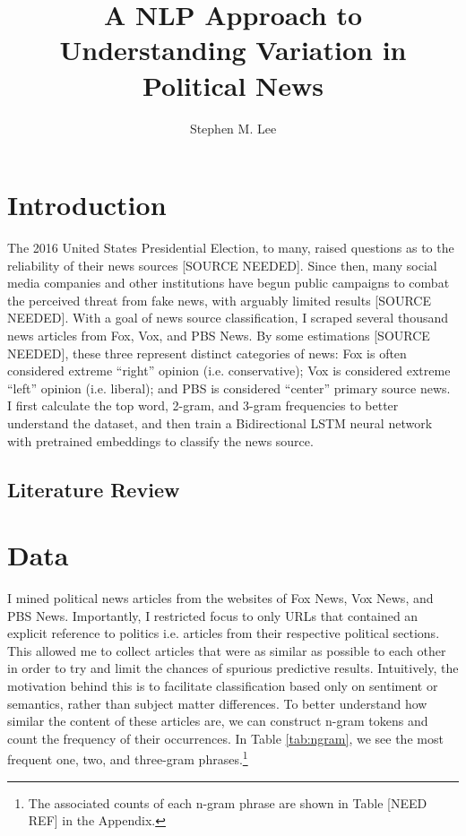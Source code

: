 \documentclass{article}
\author{Stephen M. Lee}
\title{A NLP Approach to Understanding Variation in Political News}
\begin{document}
	\maketitle 
	
	\newpage
	
	\tableofcontents
	
	\newpage
	
	\section{Introduction}
		The 2016 United States Presidential Election, to many, raised questions as to the reliability of their news sources [SOURCE NEEDED]. Since then, many social media companies and other institutions have begun public campaigns to combat the perceived threat from fake news, with arguably limited results [SOURCE NEEDED]. With a goal of news source classification, I scraped several thousand news articles from Fox, Vox, and PBS News. By some estimations [SOURCE NEEDED], these three represent distinct categories of news: Fox is often considered extreme “right” opinion (i.e. conservative); Vox is considered extreme “left” opinion (i.e. liberal); and PBS is considered “center” primary source news. I first calculate the top word, 2-gram, and 3-gram frequencies to better understand the dataset, and then train a Bidirectional LSTM neural network with pretrained embeddings to classify the news source. 
		\subsection{Literature Review}
	
	\section{Data}
	    I mined political news articles from the websites of Fox News, Vox News, and PBS News. Importantly, I restricted focus to only URLs that contained an explicit reference to politics i.e. articles from their respective political sections. This allowed me to collect articles that were as similar  as possible to each other in order to try and limit the chances of spurious predictive results. Intuitively, the motivation behind this is to facilitate classification based only on sentiment or semantics, rather than subject matter differences. To better understand how similar the content of these articles are, we can construct n-gram tokens and count the frequency of their occurrences. In Table \ref{tab:ngram}, we see the most frequent one, two, and three-gram phrases.\footnote{The associated counts of each n-gram phrase are shown in Table [NEED REF] in the Appendix.}
	    
\end{document}
